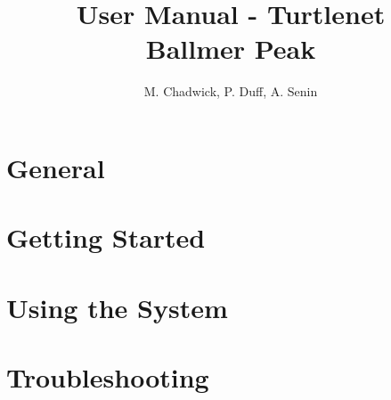 \documentclass[openany]{book}
\title{User Manual - Turtlenet\\Ballmer Peak}
\author{M. Chadwick, P. Duff, A. Senin}
\begin{document}
\maketitle
\tableofcontents

\chapter{General}


\chapter{Getting Started}


\chapter{Using the System}


\chapter{Troubleshooting}

\end{document}
